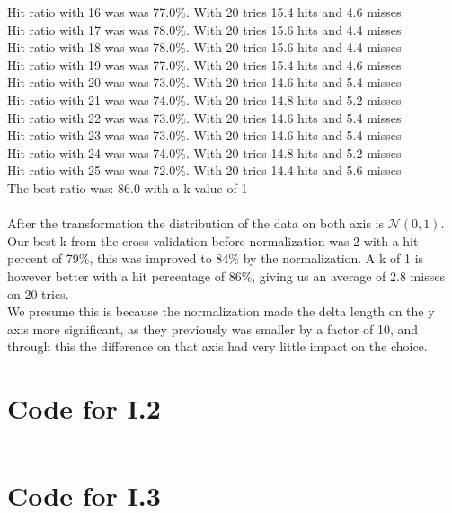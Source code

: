 \documentclass{article}
\begin{document}
Hit ratio with 16 was  {\color{green}was 77.0\%}. With 20 tries 15.4 hits and 4.6 misses\\
Hit ratio with 17 was  {\color{green}was 78.0\%}. With 20 tries 15.6 hits and 4.4 misses\\
Hit ratio with 18 was  {\color{green}was 78.0\%}. With 20 tries 15.6 hits and 4.4 misses\\
Hit ratio with 19 was  {\color{green}was 77.0\%}. With 20 tries 15.4 hits and 4.6 misses\\
Hit ratio with 20 was  {\color{green}was 73.0\%}. With 20 tries 14.6 hits and 5.4 misses\\
Hit ratio with 21 was  {\color{green}was 74.0\%}. With 20 tries 14.8 hits and 5.2 misses\\
Hit ratio with 22 was  {\color{green}was 73.0\%}. With 20 tries 14.6 hits and 5.4 misses\\
Hit ratio with 23 was  {\color{green}was 73.0\%}. With 20 tries 14.6 hits and 5.4 misses\\
Hit ratio with 24 was  {\color{green}was 74.0\%}. With 20 tries 14.8 hits and 5.2 misses\\
Hit ratio with 25 was  {\color{green}was 72.0\%}. With 20 tries 14.4 hits and 5.6 misses\\
The best ratio was: 86.0 with a k value of 1\\\\
After the transformation the distribution of the data on both axis is $\mathscr{N}(0,1)$. Our best k from the 
cross validation before normalization was 2 with a hit percent of 79\%, this was improved to 84\% by the normalization. 
A k of 1 is however better with a hit percentage of 86\%, giving us an average of 2.8 misses on 20 tries.\\
We presume this is because the normalization made the delta length on the y axis more significant, as they previously was smaller by a factor of 10,
and through this the difference on that axis had very little impact on the choice.

\newpage
\begin{appendices}

\section{Code for I.2}

\inputminted{matlab}{matlab.m}

\section{Code for I.3}

\inputminted{python}{part2/neighborJohn.py}

\end{appendices}
\end{document}
